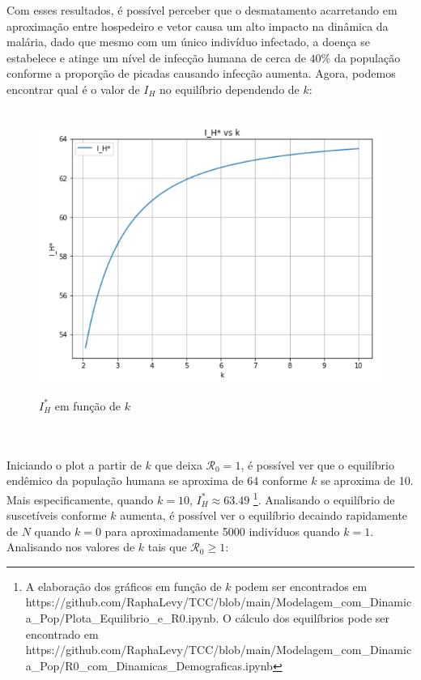 \newpage
Com esses resultados, é possível perceber que o desmatamento acarretando em aproximação
entre hospedeiro e vetor causa um alto impacto na dinâmica da malária,
dado que mesmo com um único indivíduo infectado, a doença se estabelece e atinge 
um nível de infecção humana de cerca de $40\%$ da população conforme a 
proporção de picadas causando infecção aumenta. Agora, podemos encontrar qual é o valor de $I_H$
no equilíbrio dependendo de $k$:
\begin{figure}[!ht]
        \centering
        \hbox{\hspace{4.2em} \includegraphics[scale=0.7] {Plot_I_H_vs_k.png}}
        \caption{$I_H^*$ em função de $k$}
\end{figure} 
\\\\
Iniciando o plot a partir de $k$ que deixa $\mathcal{R}_0 = 1$, é possível ver que
o equilíbrio endêmico da população humana se aproxima de 64 conforme $k$ se aproxima de 10.
Mais especificamente, quando $k=10$, $I_H^* \approx 63.49$ \footnote{A elaboração 
dos gráficos em função de $k$ podem ser encontrados em https://github.com/RaphaLevy/TCC/blob/main/Modelagem\_com\_Dinamica\_Pop/Plota\_Equilibrio\_e\_R0.ipynb. 
O cálculo dos equilíbrios pode ser encontrado em
https://github.com/RaphaLevy/TCC/blob/main/Modelagem\_com\_Dinamica\_Pop/R0\_com\_Dinamicas\_Demograficas.ipynb}.
Analisando o equilíbrio de suscetíveis conforme $k$ aumenta, é possível 
ver o equilíbrio decaindo rapidamente
de $N$ quando $k=0$ para aproximadamente 5000 indivíduos quando $k=1$. Analisando 
nos valores de $k$ tais que $\mathcal{R}_0 \geq 1$:

